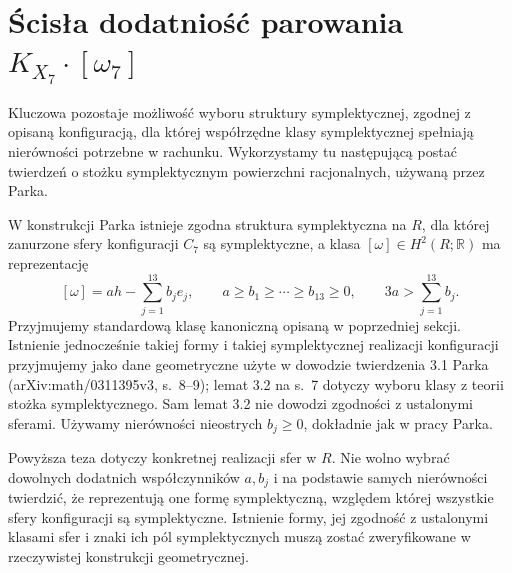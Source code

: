 \section{Ścisła dodatniość parowania \texorpdfstring{$K_{X_7}\cdot[\omega_7]$}{K omega}}
\label{sec:tg-park14-positivity}

Kluczowa pozostaje możliwość wyboru struktury symplektycznej,
zgodnej z opisaną konfiguracją, dla której współrzędne klasy
symplektycznej spełniają nierówności potrzebne w rachunku.
Wykorzystamy tu następującą postać twierdzeń o stożku
symplektycznym powierzchni racjonalnych, używaną przez Parka.

\begin{twierdzenie}
\label{thm:tg-park14-cone}
W konstrukcji Parka istnieje zgodna struktura symplektyczna
na $R$, dla której zanurzone sfery konfiguracji $C_7$
są symplektyczne, a klasa $[\omega]\in H^2(R;\mathbb R)$
ma reprezentację
\[
[\omega]=a h-\sum_{j=1}^{13}b_j e_j,
\qquad
 a\ge b_1\ge\cdots\ge b_{13}\ge0,
\qquad 3a>\sum_{j=1}^{13}b_j.
\]
Przyjmujemy standardową klasę kanoniczną opisaną
w poprzedniej sekcji. Istnienie jednocześnie takiej formy
i takiej symplektycznej realizacji konfiguracji przyjmujemy
jako dane geometryczne użyte w dowodzie twierdzenia 3.1
Parka (arXiv:math/0311395v3, s.~8--9); lemat 3.2
na s.~7 dotyczy wyboru klasy z teorii stożka
symplektycznego. Sam lemat 3.2 nie dowodzi
zgodności z ustalonymi sferami. Używamy nierówności
nieostrych $b_j\ge0$, dokładnie jak w pracy Parka.
\end{twierdzenie}

\begin{uwaga}
Powyższa teza dotyczy konkretnej realizacji sfer w $R$.
Nie wolno wybrać dowolnych dodatnich współczynników
$a,b_j$ i na podstawie samych nierówności twierdzić,
że reprezentują one formę symplektyczną, względem której
wszystkie sfery konfiguracji są symplektyczne.
Istnienie formy, jej zgodność z ustalonymi klasami sfer
i znaki ich pól symplektycznych muszą zostać zweryfikowane
w rzeczywistej konstrukcji geometrycznej.
\end{uwaga}

